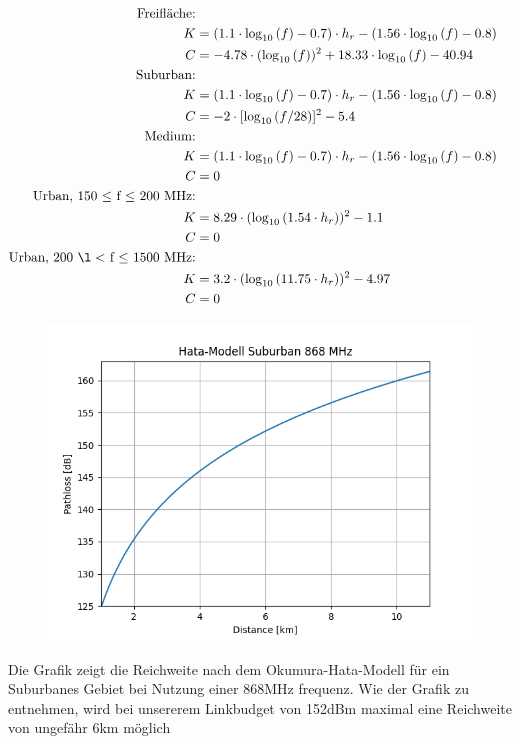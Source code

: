 \documentclass[12pt,a4paper]{article}
\begin{document}
\begin{align*}
\text{Freifläche:} \\
K &= (1.1 \cdot \log_{10}{(f)} - 0.7) \cdot h_r - (1.56 \cdot \log_{10}{(f)} - 0.8) \\
C &= -4.78 \cdot (\log_{10}{(f)})^2 + 18.33 \cdot \log_{10}{(f)} - 40.94\\
\text{Suburban:} \\
K &= (1.1 \cdot \log_{10}{(f)} - 0.7) \cdot h_r - (1.56 \cdot \log_{10}{(f)} - 0.8) \\
C &= -2 \cdot [\log_{10}{(f/28)}]^2 - 5.4\\
\text{Medium:} \\
K &= (1.1 \cdot \log_{10}{(f)} - 0.7) \cdot h_r - (1.56 \cdot \log_{10}{(f)} - 0.8) \\
C &= 0 \\
\text{Urban, 150 $\leq$ f $\leq$ 200 MHz:} \\ 
K &= 8.29 \cdot (\log_{10}{(1.54 \cdot h_r)})^2  - 1.1 \\
C &= 0 \\
\text{Urban, 200 $\l <$ f $\leq $ 1500 MHz:} \\
K &= 3.2 \cdot (\log_{10}{(11.75 \cdot h_r)})^2 - 4.97 \\
C &= 0 \\
\end{align*}
\newpage
\begin{figure}[h]
	\centering \includegraphics[scale=0.7]{Figure_2.png}
\end{figure}
Die Grafik zeigt die Reichweite nach dem Okumura-Hata-Modell für ein Suburbanes Gebiet bei Nutzung einer 868MHz frequenz. Wie der Grafik zu entnehmen, wird bei unsererem Linkbudget von 152dBm maximal eine Reichweite von ungefähr 6km möglich\\
\end{document}
